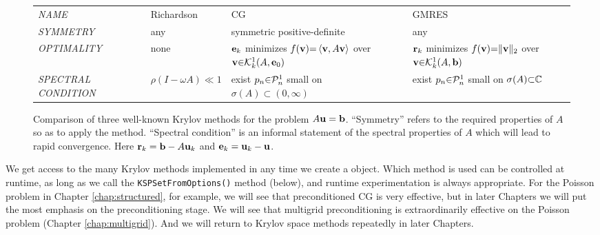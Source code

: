 \newcommand{\mpwide}{28mm}
\bigskip
\begin{figure}[h]
\small
\begin{tabular}{llll} \vspace{5mm}
\emph{NAME}\hspace{0.5in} & Richardson & CG & GMRES \\ \vspace{5mm}
\emph{SYMMETRY} & any & \begin{minipage}[l]{\mpwide}symmetric positive-definite\end{minipage} & any \\ \vspace{5mm}
\emph{OPTIMALITY} & none & \begin{minipage}[l]{25mm}$\mathbf{e}_k$ minimizes $f(\mathbf{v}){=}\left<\mathbf{v},A\mathbf{v}\right>$ over $\mathbf{v}{\in}\mathcal{K}_{k}^1(A,\mathbf{e}_0)$\end{minipage} & \begin{minipage}[l]{\mpwide}$\mathbf{r}_k$ minimizes $f(\mathbf{v}){=}\|\mathbf{v}\|_2$ over $\mathbf{v}{\in}\mathcal{K}_{k}^1(A,\mathbf{b})$\end{minipage} \\ \vspace{5mm}
\begin{minipage}[l]{21mm}\emph{SPECTRAL} \emph{CONDITION}\end{minipage} & $\rho(I-\omega A) \ll 1$ & \begin{minipage}[l]{\mpwide}exist $p_n{\in}\mathcal{P}_n^1$ small on $\sigma(A){\subset}(0,\infty)$\end{minipage} & \begin{minipage}[l]{\mpwide}exist $p_n{\in}\mathcal{P}_n^1$ small on $\sigma(A){\subset}\mathbb{C}$\end{minipage}
\end{tabular}
\caption{Comparison of three well-known Krylov methods for the problem $A\mathbf{u}=\mathbf{b}$.  ``Symmetry'' refers to the required properties of $A$ so as to apply the method.  ``Spectral condition'' is an informal statement of the spectral properties of $A$ which will lead to rapid convergence.  Here $\mathbf{r}_k=\mathbf{b}-A\mathbf{u}_k$ and $\mathbf{e}_k=\mathbf{u}_k-\mathbf{u}$.} \label{tab:krylovcompare}
\end{figure}

We get access to the many Krylov methods implemented in \PETSc any time we create a \pKSP object.  Which method is used can be controlled at runtime, as long as we call the \texttt{KSPSetFromOptions()} method (below), and runtime experimentation is always appropriate.  For the Poisson problem in Chapter \ref{chap:structured}, for example, we will see that preconditioned CG is very effective, but in later Chapters we will put the most emphasis on the preconditioning stage.  We will see that multigrid preconditioning is extraordinarily effective on the Poisson problem (Chapter \ref{chap:multigrid}).  And we will return to Krylov space methods repeatedly in later Chapters.

